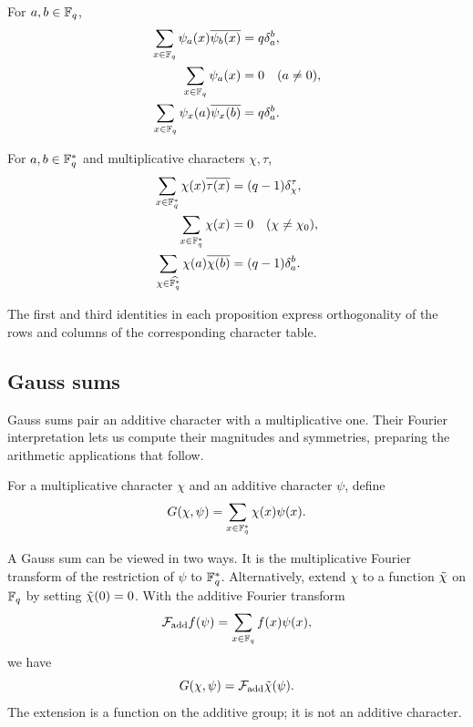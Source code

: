 \begin{prop}
For $a,b\in\mathbb{F}_q$,
\begin{align}
\label{eq-carac-add-orth-line}
 \sum_{x\in\mathbb{F}_q}\psi_a(x)\overline{\psi_b(x)}&=q\delta_a^b,\\
\label{eq-carac-add-sum}
 \sum_{x\in\mathbb{F}_q}\psi_a(x)&=0\quad(a\neq0),\\
\label{eq-carac-add-orth-col}
 \sum_{x\in\mathbb{F}_q}\psi_x(a)\overline{\psi_x(b)}&=q\delta_a^b.
\end{align}
\end{prop}


\begin{prop}
For $a,b\in\mathbb{F}_q^*$ and multiplicative characters $\chi,\tau$,
\begin{align}
\label{eq-char-mult-orth-line}
 \sum_{x\in\mathbb{F}_q^*}\chi(x)\overline{\tau(x)}&=(q-1)\delta_\chi^\tau,\\
\label{eq-carac-mult-sum}
 \sum_{x\in\mathbb{F}_q^*}\chi(x)&=0\quad(\chi\neq\chi_0),\\
\label{eq-carac-mult-orth-col}
 \sum_{\chi\in\widehat{\mathbb{F}_q^*}}\chi(a)\overline{\chi(b)}&=(q-1)\delta_a^b.
\end{align}
\end{prop}
The first and third identities in each proposition express orthogonality of
the rows and columns of the corresponding character table.

\subsection{Gauss sums}
\label{sect2-are-gauss}

Gauss sums pair an additive character with a multiplicative one. Their
Fourier interpretation lets us compute their magnitudes and symmetries,
preparing the arithmetic applications that follow.

\begin{defn}
\label{defn-sum-gauss}\label{notation-29}
For a multiplicative character $\chi$ and an additive character $\psi$, define
\begin{equation}
\label{eq-defn-sum-gauss}
 G(\chi,\psi)=\sum_{x\in\mathbb{F}_q^*}\chi(x)\psi(x).
\end{equation}
\end{defn}
\label{notation-30}
A Gauss sum can be viewed in two ways. It is the multiplicative Fourier
transform of the restriction of $\psi$ to $\mathbb{F}_q^*$. Alternatively, extend
$\chi$ to a function $\tilde{\chi}$ on $\mathbb{F}_q$ by setting $\tilde{\chi}(0)=0$.
\label{notation-31}
With the additive Fourier transform
\begin{equation}
\label{eq-transforme-fourier-additive}
 \mathcal{F}_{\mathrm{add}}f(\psi)=\sum_{x\in\mathbb{F}_q}f(x)\psi(x),
\end{equation}
we have
\begin{equation}
\label{eq-trans-fourier-add-sum-gauss}
 G(\chi,\psi)=\mathcal{F}_{\mathrm{add}}\tilde{\chi}(\psi).
\end{equation}
The extension is a function on the additive group; it is not an additive
character.

